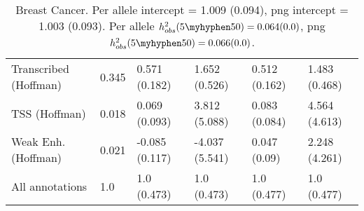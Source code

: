 \documentclass[11pt]{article}
\begin{document}
\begin{table}[H]
\begin{center}
\begin{tabular}{l|lllll}
Transcribed (Hoffman)  &  0.345 & 0.571 (0.182) & 1.652 (0.526) &
0.512 (0.162) & 1.483 (0.468) \\
TSS (Hoffman)  &  0.018 & 0.069 (0.093) & 3.812 (5.088) &
0.083 (0.084) & 4.564 (4.613) \\
Weak Enh. (Hoffman)  &  0.021 & -0.085 (0.117) & -4.037 (5.541) &
0.047 (0.09) & 2.248 (4.261) \\
All annotations  &  1.0 & 1.0 (0.473) & 1.0 (0.473) &
1.0 (0.477) & 1.0 (0.477) \\
\end{tabular}
\caption{Breast Cancer.
Per allele intercept = 1.009 (0.094),
png intercept = 1.003 (0.093).
Per allele $h^2_{obs}(5\myhyphen50) = 0.064 (0.0)$,
png $h^2_{obs}(5\myhyphen50) = 0.066 (0.0)$.}
\end{center}
\end{table}
\end{document}
